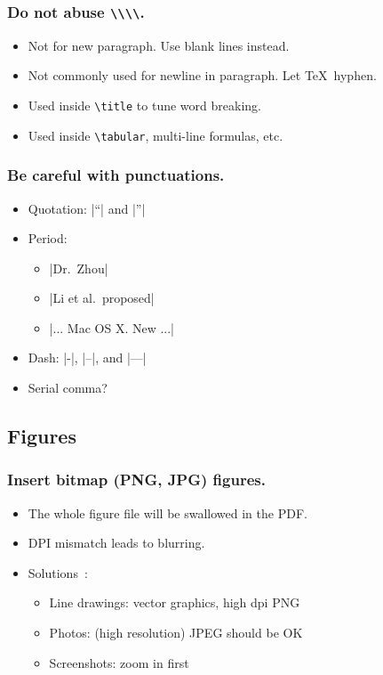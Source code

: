 \documentclass[CJKchecksingle]{beamer}
\begin{document}
\begin{frame}[fragile]\frametitle{Do not abuse \lstinline|\\\\|.}

\begin{itemize}
\item
  Not for new paragraph. Use blank lines instead.
\item
  Not commonly used for newline in paragraph. Let \TeX\ hyphen.
\pause
\item
  Used inside \lstinline{\title} to tune word breaking.
\item
  Used inside \lstinline{\tabular}, multi-line formulas, etc.
\end{itemize}

\end{frame}

\begin{frame}[fragile]\frametitle{Be careful with punctuations.}
  \begin{itemize}
    \item Quotation: |``| and |''|
    \item Period:
      \begin{itemize}
        \item |Dr.~Zhou|
        \item |Li et al.\ proposed|
        \item |... Mac OS X\@. New ...|
      \end{itemize}
    \item Dash: |-|, |--|, and |---|
    \item Serial comma?
  \end{itemize}
\end{frame}

\subsection{Figures}

\begin{frame}\frametitle{Insert bitmap (PNG, JPG) figures.}

\begin{itemize}
\item
  The whole figure file will be swallowed in the PDF.
\item
  DPI mismatch leads to blurring.
\pause
\item
  Solutions~\cite{hoeppner,blurry,blurry2}:
  \begin{itemize}
    \item
      Line drawings: \alert{vector graphics}, high dpi PNG
    \item
      Photos: (high resolution) JPEG should be OK
    \item
      Screenshots: zoom in first
  \end{itemize}
\end{itemize}

\end{frame}
\end{document}
